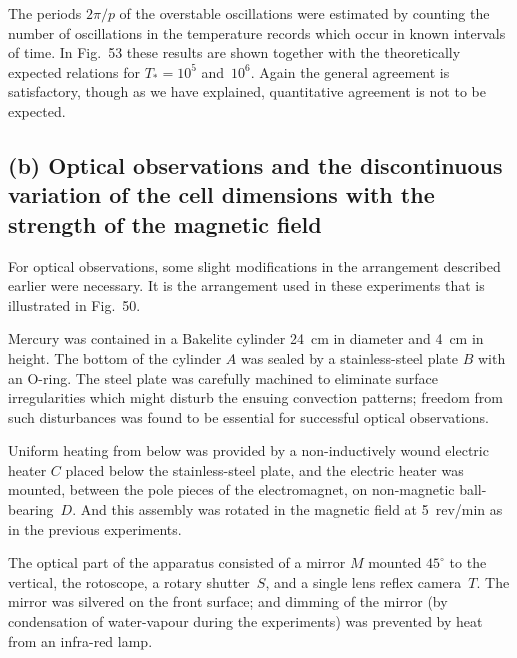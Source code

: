 The periods $2\pi/p$ of the overstable oscillations were estimated by
counting the number of oscillations in the temperature records which
occur in known intervals of time. In Fig.~53 these results are shown
together with the theoretically expected relations for $T_* = 10^5$ and~$10^6$.
Again the general agreement is satisfactory, though as we have explained,
quantitative agreement is not to be expected.



\subsection*{(b) Optical observations and the discontinuous variation of the cell
dimensions with the strength of the magnetic field}

For optical observations, some slight modifications in the arrangement
described earlier were necessary. It is the arrangement used in these
experiments that is illustrated in Fig.~50.

Mercury was contained in a Bakelite cylinder 24~cm in diameter and
4~cm in height. The bottom of the cylinder $A$ was sealed by a stainless-steel plate $B$ with an O-ring. The steel plate was carefully machined to
eliminate surface irregularities which might disturb the ensuing convection patterns; freedom from such disturbances was found to be essential
for successful optical observations.

Uniform heating from below was provided by a non-inductively
wound electric heater $C$ placed below the stainless-steel plate, and
the electric heater was mounted, between the pole pieces of the electromagnet, on non-magnetic ball-bearing~$D$. And this assembly was rotated
in the magnetic field at 5~rev/min as in the previous experiments.

The optical part of the apparatus consisted of a mirror $M$ mounted $45^\circ$
to the vertical, the rotoscope, a rotary shutter~$S$, and a single lens reflex
camera~$T$. The mirror was silvered on the front surface; and dimming
of the mirror (by condensation of water-vapour during the experiments)
was prevented by heat from an infra-red lamp.

